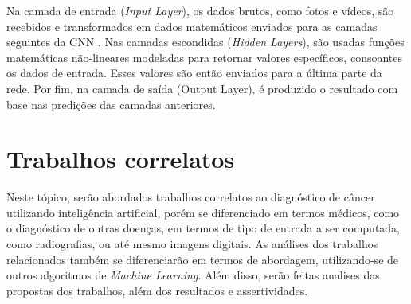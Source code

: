 Na camada de entrada (\textit{Input Layer}), os dados brutos, como fotos e vídeos, são recebidos e transformados em dados matemáticos enviados para as camadas seguintes da CNN \cite{cnn}. Nas camadas escondidas (\textit{Hidden Layers}), são usadas funções matemáticas não-lineares modeladas para retornar valores específicos, consoantes os dados de entrada. Esses valores são então enviados para a última parte da rede. Por fim, na camada de saída (Output Layer), é produzido o resultado com base nas predições das camadas anteriores.








%
\section{\esp Trabalhos correlatos}






Neste tópico, serão abordados trabalhos correlatos ao diagnóstico de câncer utilizando inteligência artificial, porém se diferenciado em termos médicos, como o diagnóstico de outras doenças, em termos de tipo de entrada a ser computada, como radiografias, ou até mesmo imagens digitais. As análises dos trabalhos relacionados também se diferenciarão em termos de abordagem, utilizando-se de outros algoritmos de \textit{Machine Learning}. Além disso, serão feitas analises das propostas dos trabalhos, além dos resultados e assertividades.

